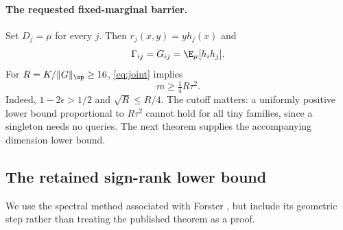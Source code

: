 \paragraph{The requested fixed-marginal barrier.}
Set $D_j=\mu$ for every $j$. Then $r_j(x,y)=y h_j(x)$ and
\[
 \Gamma_{ij}=G_{ij}=\E_\mu[h_i h_j].
\]
For $R=K/\|G\|_\op\geq16$, \eqref{eq:joint} implies
\begin{equation}\label{eq:fixed}
 m\geq\tfrac14 R\tau^2.
\end{equation}
Indeed, $1-2\epsilon>1/2$ and $\sqrt R\leq R/4$. The cutoff matters: a uniformly positive lower bound proportional to $R\tau^2$ cannot hold for all tiny families, since a singleton needs no queries. The next theorem supplies the accompanying dimension lower bound.

\subsection{The retained sign-rank lower bound}
We use the spectral method associated with Forster \citep{Forster02}, but include its geometric step rather than treating the published theorem as a proof.

